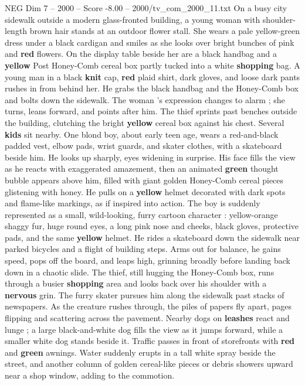 \begin{textsample}{NEG Dim 7 – 2000 – Score -8.00 – 2000/tv\_com\_2000\_11.txt}  \label{ex:f7_neg_021}
On a busy city sidewalk outside a modern glass-fronted building, a young woman with shoulder-length brown hair stands at an outdoor flower stall.
She wears a pale yellow-green dress under a black cardigan and smiles as she looks over bright bunches of pink and \textbf{red} flowers.
On the display table beside her are a black handbag and a \textbf{yellow} Post Honey-Comb cereal box partly tucked into a white \textbf{shopping} bag.
A young man in a black \textbf{knit} cap, \textbf{red} plaid shirt, dark gloves, and loose dark pants rushes in from behind her.
He grabs the black handbag and the Honey-Comb box and bolts down the sidewalk.
The woman ’s expression changes to alarm ; she turns, leans forward, and points after him.
The thief sprints past benches outside the building, clutching the bright \textbf{yellow} cereal box against his chest.
Several \textbf{kids} sit nearby.
One blond boy, about early teen age, wears a red-and-black padded vest, elbow pads, wrist guards, and skater clothes, with a skateboard beside him.
He looks up sharply, eyes widening in surprise.
His face fills the view as he reacts with exaggerated amazement, then an animated \textbf{green} thought bubble appears above him, filled with giant golden Honey-Comb cereal pieces glistening with honey.
He pulls on a \textbf{yellow} helmet decorated with dark spots and flame-like markings, as if inspired into action.
The boy is suddenly represented as a small, wild-looking, furry cartoon character : yellow-orange shaggy fur, huge round eyes, a long pink nose and cheeks, black gloves, protective pads, and the same \textbf{yellow} helmet.
He rides a skateboard down the sidewalk near parked bicycles and a flight of building steps.
Arms out for balance, he gains speed, pops off the board, and leaps high, grinning broadly before landing back down in a chaotic slide.
The thief, still hugging the Honey-Comb box, runs through a busier \textbf{shopping} area and looks back over his shoulder with a \textbf{nervous} grin.
The furry skater pursues him along the sidewalk past stacks of newspapers.
As the creature rushes through, the piles of papers fly apart, pages flipping and scattering across the pavement.
Nearby dogs on \textbf{leashes} react and lunge ; a large black-and-white dog fills the view as it jumps forward, while a smaller white dog stands beside it.
Traffic passes in front of storefronts with \textbf{red} and \textbf{green} awnings.
Water suddenly erupts in a tall white spray beside the street, and another column of golden cereal-like pieces or debris showers upward near a shop window, adding to the commotion.

\end{textsample}
